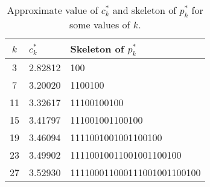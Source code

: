 \documentclass[a4paper, 11pt]{article}
\theoremstyle{plain}
\theoremstyle{definition}
\theoremstyle{remark}
\begin{document}
\begin{table}[htbp]
	\begin{center}
	\begin{tabular}{ |c|l|l| } 
	\hline
	$k$ & $c_k^*$ & Skeleton of $p_k^*$ \\ 
	\hline
	3 & 2.82812 & 100 \\
	7 & 3.20020 & 1100100 \\
	11 & 3.32617 & 11100100100 \\
	15 & 3.41797 & 111001001100100 \\
	19 & 3.46094 & 1111001001001100100 \\
	23 & 3.49902 & 11110010011001001100100 \\
	27 & 3.52930 & 111100011000111001001100100 \\
	\hline
	\end{tabular}
	\end{center}
	\caption{Approximate value of $c_k^*$ and skeleton of $p_k^*$ for some values of $k$.}\label{table:ilp_res}
\end{table}

\end{document}
